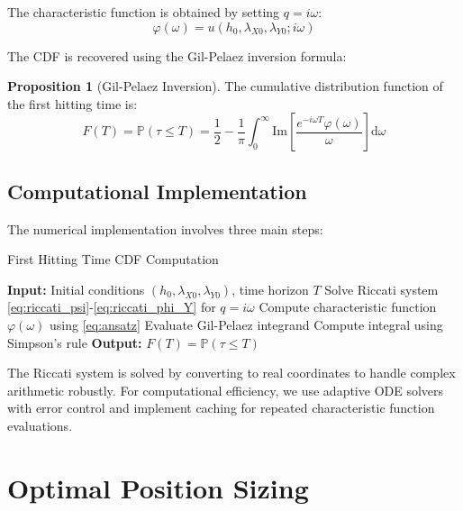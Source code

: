\documentclass{article}
\renewcommand{\P}{\mathbb{P}}
\newcommand{\diff}{\mathrm{d}}
\theoremstyle{definition}
\newtheorem{proposition}{Proposition}[section]
\begin{document}
The characteristic function is obtained by setting $q = i\omega$:
\begin{equation}
\varphi(\omega) = u(h_0, \lambda_{X0}, \lambda_{Y0}; i\omega)
\end{equation}

The CDF is recovered using the Gil-Pelaez inversion formula:

\begin{proposition}[Gil-Pelaez Inversion]
\label{prop:gilpelaez}
The cumulative distribution function of the first hitting time is:
\begin{equation}
F(T) = \P(\tau \leq T) = \frac{1}{2} - \frac{1}{\pi} \int_0^{\infty} \text{Im}\left[\frac{e^{-i\omega T} \varphi(\omega)}{\omega}\right] \diff\omega \label{eq:gil_pelaez}
\end{equation}
\end{proposition}

\subsection{Computational Implementation}

The numerical implementation involves three main steps:

\begin{algorithm}
\caption{First Hitting Time CDF Computation}
\begin{algorithmic}[1]
\STATE \textbf{Input:} Initial conditions $(h_0, \lambda_{X0}, \lambda_{Y0})$, time horizon $T$
    \STATE Solve Riccati system \eqref{eq:riccati_psi}-\eqref{eq:riccati_phi_Y} for $q = i\omega$
    \STATE Compute characteristic function $\varphi(\omega)$ using \eqref{eq:ansatz}
    \STATE Evaluate Gil-Pelaez integrand
\ENDFOR
\STATE Compute integral using Simpson's rule
\STATE \textbf{Output:} $F(T) = \P(\tau \leq T)$
\end{algorithmic}
\end{algorithm}

The Riccati system is solved by converting to real coordinates to handle complex arithmetic robustly. For computational efficiency, we use adaptive ODE solvers with error control and implement caching for repeated characteristic function evaluations.

\section{Optimal Position Sizing}
\end{document}
